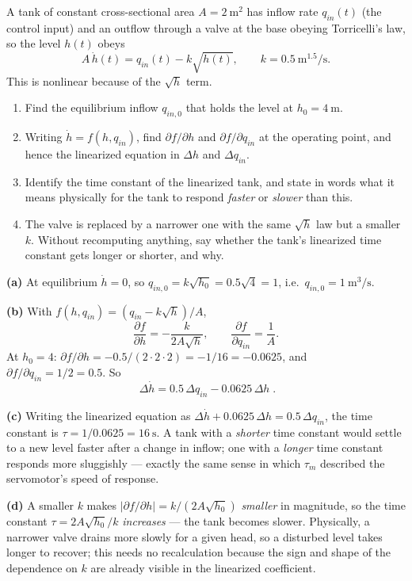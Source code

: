 \documentclass[11pt,a4paper]{article}
\begin{document}
A tank of constant cross-sectional area $A=\SI{2}{\metre\squared}$ has inflow
rate $q_{in}(t)$ (the control input) and an outflow through a valve at the
base obeying Torricelli's law, so the level $h(t)$ obeys
\[
  A\,\dot h(t) = q_{in}(t) - k\sqrt{h(t)}, \qquad k=\SI{0.5}{\metre^{1.5}\per\second}.
\]
This is nonlinear because of the $\sqrt{h}$ term.

\begin{enumerate}[label=(\alph*)]
\item Find the equilibrium inflow $q_{in,0}$ that holds the level at
      $h_0=\SI{4}{\metre}$.
\item Writing $\dot h=f(h,q_{in})$, find $\partial f/\partial h$ and
      $\partial f/\partial q_{in}$ at the operating point, and hence the
      linearized equation in $\Delta h$ and $\Delta q_{in}$.
\item Identify the time constant of the linearized tank, and state in words
      what it means physically for the tank to respond \emph{faster} or
      \emph{slower} than this.
\item The valve is replaced by a narrower one with the same $\sqrt{h}$ law but
      a smaller $k$. Without recomputing anything, say whether the tank's
      linearized time constant gets longer or shorter, and why.
\end{enumerate}

\begin{solution}
\textbf{(a)} At equilibrium $\dot h=0$, so $q_{in,0}=k\sqrt{h_0}=0.5\sqrt4=1$,
i.e.\ $q_{in,0}=\SI{1}{\metre\cubed\per\second}$.

\medskip
\textbf{(b)} With $f(h,q_{in})=(q_{in}-k\sqrt h)/A$,
\[
  \frac{\partial f}{\partial h}=-\frac{k}{2A\sqrt h},
  \qquad
  \frac{\partial f}{\partial q_{in}}=\frac{1}{A}.
\]
At $h_0=4$: $\partial f/\partial h=-0.5/(2\cdot2\cdot2)=-1/16=-0.0625$, and
$\partial f/\partial q_{in}=1/2=0.5$. So
\[
  \boxed{\;\Delta\dot h = 0.5\,\Delta q_{in} - 0.0625\,\Delta h\;} .
\]

\medskip
\textbf{(c)} Writing the linearized equation as
$\Delta\dot h+0.0625\,\Delta h=0.5\,\Delta q_{in}$, the time constant is
$\tau=1/0.0625=\SI{16}{\second}$. A tank with a \emph{shorter} time constant
would settle to a new level faster after a change in inflow; one with a
\emph{longer} time constant responds more sluggishly --- exactly the same
sense in which $\tau_m$ described the servomotor's speed of response.

\medskip
\textbf{(d)} A smaller $k$ makes $|\partial f/\partial h|=k/(2A\sqrt{h_0})$
\emph{smaller} in magnitude, so the time constant $\tau=2A\sqrt{h_0}/k$
\emph{increases} --- the tank becomes slower. Physically, a narrower valve
drains more slowly for a given head, so a disturbed level takes longer to
recover; this needs no recalculation because the sign and shape of the
dependence on $k$ are already visible in the linearized coefficient.
\end{solution}
\end{document}
